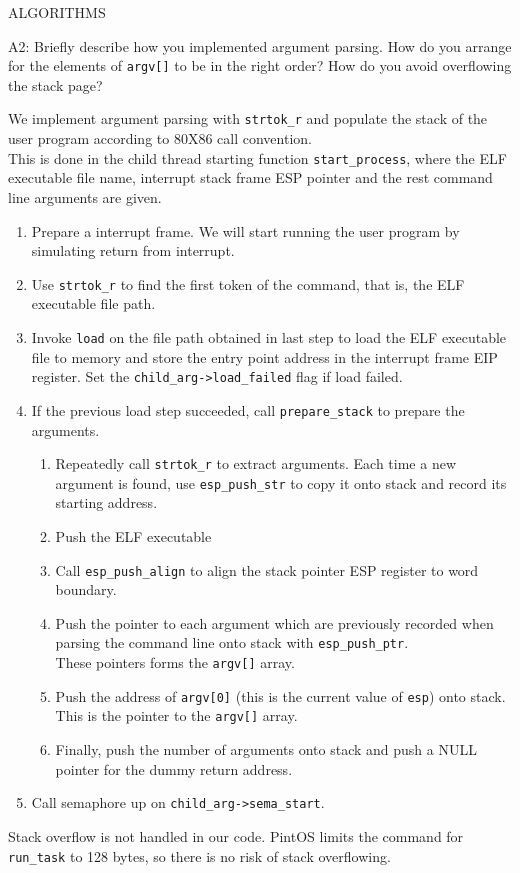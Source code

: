 \begin{aspect}{ALGORITHMS}
	\begin{qc}
		A2: Briefly describe how you implemented argument parsing.
		How do you arrange for the elements of \lstinline{argv[]} to be in the right order?
		How do you avoid overflowing the stack page?
	\end{qc}
	We implement argument parsing with \lstinline{strtok_r} and populate the stack of the user program according to 80X86 call convention.\\

	This is done in the child thread starting function \lstinline{start_process},
	where the ELF executable file name, interrupt stack frame ESP pointer and the rest command line arguments are given.
	\begin{enumerate}
		\item Prepare a interrupt frame.
		      We will start running the user program by simulating return from interrupt.
		\item Use \lstinline{strtok_r} to find the first token of the command, that is, the ELF executable file path.
		\item Invoke \lstinline{load} on the file path obtained in last step to load the ELF executable file to memory and store the entry point address in the interrupt frame EIP register.
		      Set the \lstinline{child_arg->load_failed} flag if load failed.
		\item If the previous load step succeeded, call \lstinline{prepare_stack} to prepare the arguments.
		      \begin{enumerate}
			      \item Repeatedly call \lstinline{strtok_r} to extract arguments.
			            Each time a new argument is found, use \lstinline{esp_push_str} to copy it onto stack
			            and record its starting address.
			      \item Push the ELF executable
			      \item Call \lstinline{esp_push_align} to align the stack pointer ESP register to word boundary.
			      \item Push the pointer to each argument which are previously recorded when parsing the command line
			            onto stack with \lstinline{esp_push_ptr}.\\
			            These pointers forms the \lstinline{argv[]} array.
			      \item Push the address of \lstinline{argv[0]} (this is the current value of \lstinline{esp}) onto stack.
			            This is the pointer to the \lstinline{argv[]} array.
			      \item Finally, push the number of arguments onto stack and push a NULL pointer for the dummy return address.
		      \end{enumerate}
		\item Call semaphore up on \lstinline{child_arg->sema_start}.
	\end{enumerate}

	Stack overflow is not handled in our code.
	PintOS limits the command for \lstinline{run_task} to 128 bytes, so there is no risk of stack overflowing.
\end{aspect}

